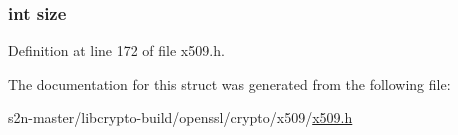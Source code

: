 \subsubsection[{\texorpdfstring{size}{size}}]{\setlength{\rightskip}{0pt plus 5cm}int size}\hypertarget{struct_x509__name__entry__st_a439227feff9d7f55384e8780cfc2eb82}{}\label{struct_x509__name__entry__st_a439227feff9d7f55384e8780cfc2eb82}


Definition at line 172 of file x509.\+h.



The documentation for this struct was generated from the following file\+:\begin{DoxyCompactItemize}
\item 
s2n-\/master/libcrypto-\/build/openssl/crypto/x509/\hyperlink{crypto_2x509_2x509_8h}{x509.\+h}\end{DoxyCompactItemize}
